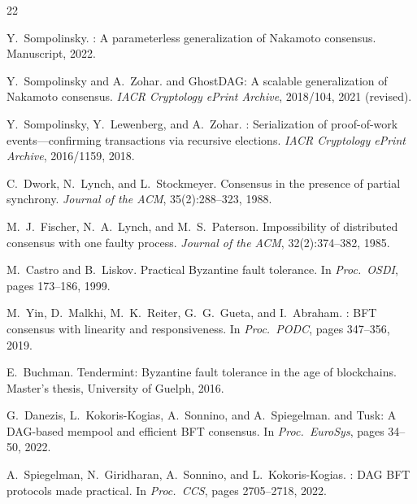 \documentclass[11pt,a4paper]{article}
\theoremstyle{definition}
\theoremstyle{remark}
\begin{document}
\begin{thebibliography}{22}

Y.~Sompolinsky.
: A parameterless generalization of {Nakamoto} consensus.
\newblock Manuscript, 2022.

Y.~Sompolinsky and A.~Zohar.
 and {GhostDAG}: A scalable generalization of {Nakamoto} consensus.
\newblock \emph{IACR Cryptology ePrint Archive}, 2018/104, 2021 (revised).

Y.~Sompolinsky, Y.~Lewenberg, and A.~Zohar.
: Serialization of proof-of-work events---confirming transactions via recursive elections.
\newblock \emph{IACR Cryptology ePrint Archive}, 2016/1159, 2018.

C.~Dwork, N.~Lynch, and L.~Stockmeyer.
\newblock Consensus in the presence of partial synchrony.
\newblock \emph{Journal of the ACM}, 35(2):288--323, 1988.

M.~J.~Fischer, N.~A.~Lynch, and M.~S.~Paterson.
\newblock Impossibility of distributed consensus with one faulty process.
\newblock \emph{Journal of the ACM}, 32(2):374--382, 1985.

M.~Castro and B.~Liskov.
\newblock Practical {Byzantine} fault tolerance.
\newblock In \emph{Proc.\ OSDI}, pages 173--186, 1999.

M.~Yin, D.~Malkhi, M.~K.~Reiter, G.~G.~Gueta, and I.~Abraham.
: {BFT} consensus with linearity and responsiveness.
\newblock In \emph{Proc.\ PODC}, pages 347--356, 2019.

E.~Buchman.
\newblock Tendermint: Byzantine fault tolerance in the age of blockchains.
\newblock Master's thesis, University of Guelph, 2016.

G.~Danezis, L.~Kokoris-Kogias, A.~Sonnino, and A.~Spiegelman.
 and {Tusk}: A {DAG}-based mempool and efficient {BFT} consensus.
\newblock In \emph{Proc.\ EuroSys}, pages 34--50, 2022.

A.~Spiegelman, N.~Giridharan, A.~Sonnino, and L.~Kokoris-Kogias.
: {DAG} {BFT} protocols made practical.
\newblock In \emph{Proc.\ CCS}, pages 2705--2718, 2022.


\end{thebibliography}
\end{document}
